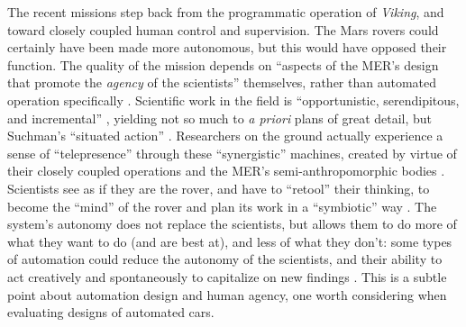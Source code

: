 The recent missions step back
from the programmatic operation of \emph{Viking}, and toward closely
coupled human control and
supervision. The Mars rovers could
certainly have been made more autonomous, but this would have opposed
their function. The quality of the mission depends on ``aspects of the
MER's design that promote the \emph{agency} of the scientists''
themselves, rather than automated operation specifically \cite[p.
  xii]{clancey}. Scientific work in the field is ``opportunistic, 
serendipitous, and incremental'' \cite[p. 32]{clancey}, yielding
not so much to \emph{a priori}
plans of great detail, but Suchman's ``situated
action'' \cite{suchmanSA}. Researchers on the ground actually
experience a sense of ``telepresence'' through these ``synergistic''
machines, created 
by virtue of their closely coupled operations and the MER's
semi-anthropomorphic bodies \cite[p. 55]{clancey}. Scientists see
as if they are the rover, and have to ``retool'' their thinking, to
become the ``mind'' of the rover and plan its work in a ``symbiotic''
way \cite[p. 106, 110, 118]{clancey}. The system's autonomy does not replace the
scientists, but allows them to do more of what they want to do (and are
best at), and less of what they don't: some types of automation could reduce the
autonomy of the scientists, and their ability to act creatively and
spontaneously to capitalize on new findings \cite[p.
  118-119]{clancey}. This is a subtle point about automation design
and human agency, one
worth considering when evaluating designs of automated cars.


